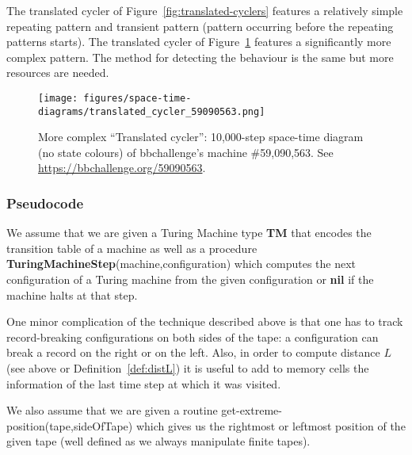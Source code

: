 The translated cycler of Figure~\ref{fig:translated-cyclers} features a relatively simple repeating pattern and transient pattern (pattern occurring before the repeating patterns starts). The translated cycler of Figure~\ref{fig:translated-cyclers-more} features a significantly more complex pattern. The method for detecting the behaviour is the same but more resources are needed.


\begin{figure}
  \centering
  \texttt{[image: figures/space-time-diagrams/translated\_cycler\_59090563.png]}

  \caption{More complex ``Translated cycler'': 10,000-step space-time diagram (no state colours) of bbchallenge's machine \#59,090,563. See \url{https://bbchallenge.org/59090563}.}\label{fig:translated-cyclers-more}
\end{figure}


\subsubsection{Pseudocode}

We assume that we are given a Turing Machine type \textbf{TM} that encodes the transition table of a machine as well as a procedure \textbf{TuringMachineStep}(machine,configuration) which computes the next configuration of a Turing machine from the given configuration or \textbf{nil} if the machine halts at that step.

One minor complication of the technique described above is that one has to track record-breaking configurations on both sides of the tape: a configuration can break a record on the right or on the left. Also, in order to compute distance $L$ (see above or Definition~\ref{def:distL}) it is useful to add to memory cells the information of the last time step at which it was visited.

We also assume that we are given a routine {\sc get-extreme-position}(tape,sideOfTape) which gives us the rightmost or leftmost position of the given tape (well defined as we always manipulate finite tapes).

